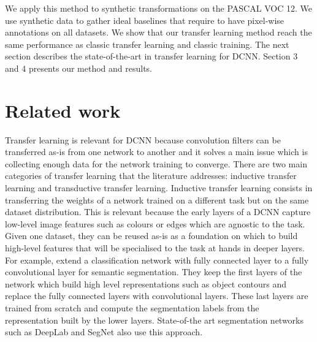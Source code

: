\documentclass{bmvc2k}
\begin{document}
We apply this method to synthetic transformations on the PASCAL VOC 12. We use 
synthetic data to gather ideal baselines that require to have pixel-wise 
annotations on 
all datasets. We show that our transfer learning method reach the same
performance as classic transfer learning and classic training. 
The next section describes the state-of-the-art in transfer learning for DCNN. 
Section 3 and 4 presents our method and results.

\section{Related work}

Transfer learning \cite{pan2010survey} is relevant for DCNN because convolution filters
can be transferred as-is from one network to another and it solves a main issue 
which is collecting enough data for the network training to converge. 
There are two main categories of transfer learning that the literature addresses: 
inductive transfer learning and transductive transfer learning. Inductive transfer 
learning consists in transferring the weights of a network trained on a different 
task but on the same dataset distribution.
This is relevant because the early layers of a DCNN
capture low-level image features such as colours or edges 
\cite{zeiler2014visualizing} which are 
agnostic to the task. Given one dataset, they can be reused as-is as a
foundation on which to 
build high-level features that will be specialised to the task at hands in deeper layers. 
For example, \cite{long2015fully} extend a classification network with fully 
connected layer to a fully convolutional layer for semantic segmentation. 
They keep the first layers of the network which build high level
representations
such as object contours and replace the fully connected layers with convolutional
layers. These last layers are trained from scratch and compute the segmentation
labels from the representation built by the lower layers. State-of-the art segmentation networks
 such as DeepLab \cite{chen2018deeplab} and SegNet \cite{badrinarayanan2017segnet}
 also use this approach.
\end{document}
